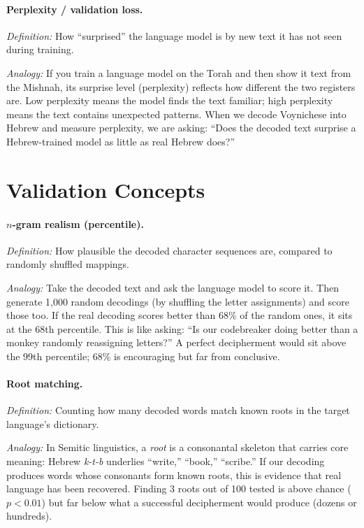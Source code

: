 \documentclass[11pt,a4paper]{article}
\begin{document}
\paragraph{Perplexity / validation loss.}
\textit{Definition:} How ``surprised'' the language model is by new text it has not seen during training.

\textit{Analogy:} If you train a language model on the Torah and then show it text from the Mishnah, its surprise level (perplexity) reflects how different the two registers are.  Low perplexity means the model finds the text familiar; high perplexity means the text contains unexpected patterns.  When we decode Voynichese into Hebrew and measure perplexity, we are asking: ``Does the decoded text surprise a Hebrew-trained model as little as real Hebrew does?''


\section{Validation Concepts}

\paragraph{$n$-gram realism (percentile).}
\textit{Definition:} How plausible the decoded character sequences are, compared to randomly shuffled mappings.

\textit{Analogy:} Take the decoded text and ask the language model to score it.  Then generate 1,000 random decodings (by shuffling the letter assignments) and score those too.  If the real decoding scores better than 68\% of the random ones, it sits at the 68th percentile.  This is like asking: ``Is our codebreaker doing better than a monkey randomly reassigning letters?''  A perfect decipherment would sit above the 99th percentile; 68\% is encouraging but far from conclusive.

\paragraph{Root matching.}
\textit{Definition:} Counting how many decoded words match known roots in the target language's dictionary.

\textit{Analogy:} In Semitic linguistics, a \textit{root} is a consonantal skeleton that carries core meaning: Hebrew \textit{k-t-b} underlies ``write,'' ``book,'' ``scribe.''  If our decoding produces words whose consonants form known roots, this is evidence that real language has been recovered.  Finding 3 roots out of 100 tested is above chance ($p < 0.01$) but far below what a successful decipherment would produce (dozens or hundreds).
\end{document}
